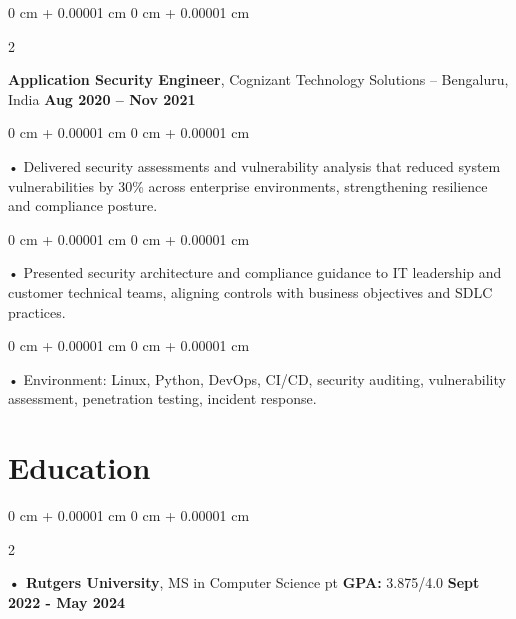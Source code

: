 \documentclass[10pt, letterpaper]{article}
\newenvironment{onecolentry}{
    \begin{adjustwidth}{
        0 cm + 0.00001 cm
    }{
        0 cm + 0.00001 cm
    }
}{
    \end{adjustwidth}
} %
\newenvironment{twocolentry}[2][]{
    \onecolentry
    \def\secondColumn{#2}
    \setcolumnwidth{\fill, 4.5 cm}
    \begin{paracol}{2}
}{
    \switchcolumn \raggedleft \secondColumn
    \end{paracol}
    \endonecolentry
} %
\begin{document}
        \begin{twocolentry}{
            \textbf{Aug 2020 – Nov 2021}
        }
            \vspace{2 pt }
            \textbf{Application Security Engineer}, Cognizant Technology Solutions -- Bengaluru, India\end{twocolentry}
        \begin{onecolentry}
             • Delivered security assessments and vulnerability analysis that reduced system vulnerabilities by 30\% across enterprise environments, strengthening resilience and compliance posture.
        \end{onecolentry}
        \begin{onecolentry}
             • Presented security architecture and compliance guidance to IT leadership and customer technical teams, aligning controls with business objectives and SDLC practices.
        \end{onecolentry}
        \begin{onecolentry}
             • Environment: Linux, Python, DevOps, CI/CD, security auditing, vulnerability assessment, penetration testing, incident response.
        \end{onecolentry}
    \vspace{2 pt }
        \section{Education}
        \vspace{2 pt }
        \begin{twocolentry}{
            \textbf{Sept 2022 - May 2024}
        }
            \textbf{ • Rutgers University}, MS in Computer Science  pt \textbf{GPA:} 3.875/4.0  \end{twocolentry}
\end{document}
